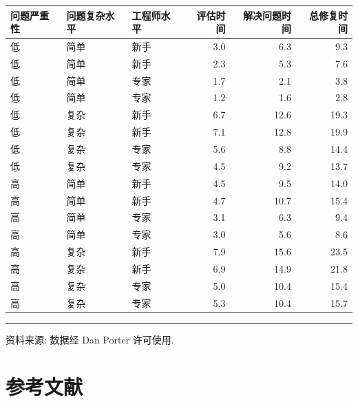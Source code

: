 
\begin{mvtable}
\label{tab:6.20}
\begin{tabular}{lllrrr}
\toprule
问题严重性 & 问题复杂水平 & 工程师水平 & 评估时间 & 解决问题时间 & 总修复时间\\\midrule
低 & 简单 & 新手 & 3.0 & 6.3 & 9.3\\
低 & 简单 & 新手 & 2.3 & 5.3 & 7.6\\
低 & 简单 & 专家 & 1.7 & 2.1 & 3.8\\
低 & 简单 & 专家 & 1.2 & 1.6 & 2.8\\
低 & 复杂 & 新手 & 6.7 & 12.6 & 19.3\\
低 & 复杂 & 新手 & 7.1 & 12.8 & 19.9\\
低 & 复杂 & 专家 & 5.6 & 8.8 & 14.4\\
低 & 复杂 & 专家 & 4.5 & 9.2 & 13.7\\
高 & 简单 & 新手 & 4.5 & 9.5 & 14.0\\
高 & 简单 & 新手 & 4.7 & 10.7 & 15.4\\
高 & 简单 & 专家 & 3.1 & 6.3 & 9.4\\
高 & 简单 & 专家 & 3.0 & 5.6 & 8.6\\
高 & 复杂 & 新手 & 7.9 & 15.6 & 23.5\\
高 & 复杂 & 新手 & 6.9 & 14.9 & 21.8\\
高 & 复杂 & 专家 & 5.0 & 10.4 & 15.4\\
高 & 复杂 & 专家 & 5.3 & 10.4 & 15.7\\
\bottomrule
\end{tabular}
\end{mvtable}

\vspace{2pt}
\noindent\rule{\linewidth}{0.4pt}

\noindent\small 资料来源: 数据经 Dan Porter 许可使用.

\label{bib:6}
\section*{参考文献}

